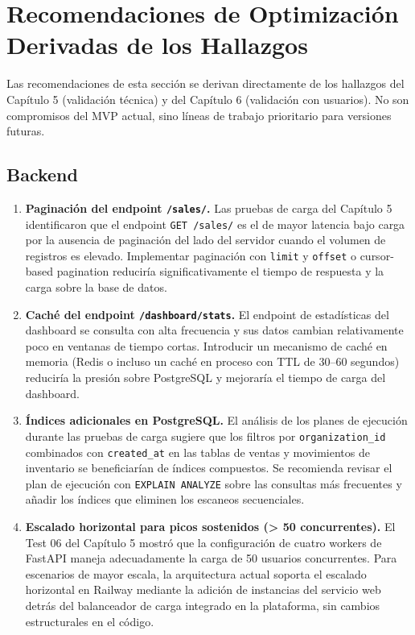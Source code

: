 \section{Recomendaciones de Optimización Derivadas de los Hallazgos}\label{recomendaciones-de-optimizaciuxf3n-derivadas-de-los-hallazgos}

Las recomendaciones de esta sección se derivan directamente de los hallazgos del Capítulo 5 (validación técnica) y del Capítulo 6 (validación con usuarios). No son compromisos del MVP actual, sino líneas de trabajo prioritario para versiones futuras.

\subsection{Backend}\label{backend}

\begin{enumerate}
\def\labelenumi{\arabic{enumi}.}
\item
  \textbf{Paginación del endpoint \texttt{/sales/}.} Las pruebas de carga del Capítulo 5 identificaron que el endpoint \texttt{GET\ /sales/} es el de mayor latencia bajo carga por la ausencia de paginación del lado del servidor cuando el volumen de registros es elevado. Implementar paginación con \texttt{limit} y \texttt{offset} o cursor-based pagination reduciría significativamente el tiempo de respuesta y la carga sobre la base de datos.
\item
  \textbf{Caché del endpoint \texttt{/dashboard/stats}.} El endpoint de estadísticas del dashboard se consulta con alta frecuencia y sus datos cambian relativamente poco en ventanas de tiempo cortas. Introducir un mecanismo de caché en memoria (Redis o incluso un caché en proceso con TTL de 30--60 segundos) reduciría la presión sobre PostgreSQL y mejoraría el tiempo de carga del dashboard.
\item
  \textbf{Índices adicionales en PostgreSQL.} El análisis de los planes de ejecución durante las pruebas de carga sugiere que los filtros por \texttt{organization\_id} combinados con \texttt{created\_at} en las tablas de ventas y movimientos de inventario se beneficiarían de índices compuestos. Se recomienda revisar el plan de ejecución con \texttt{EXPLAIN\ ANALYZE} sobre las consultas más frecuentes y añadir los índices que eliminen los escaneos secuenciales.
\item
  \textbf{Escalado horizontal para picos sostenidos (\textgreater{} 50 concurrentes).} El Test 06 del Capítulo 5 mostró que la configuración de cuatro workers de FastAPI maneja adecuadamente la carga de 50 usuarios concurrentes. Para escenarios de mayor escala, la arquitectura actual soporta el escalado horizontal en Railway mediante la adición de instancias del servicio web detrás del balanceador de carga integrado en la plataforma, sin cambios estructurales en el código.
\end{enumerate}

